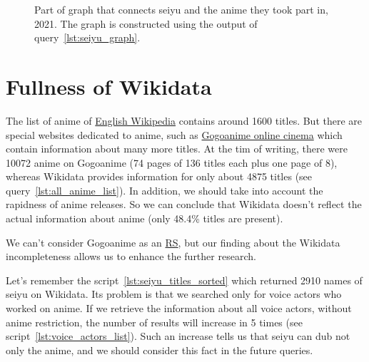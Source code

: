 \begin{figure*}

    \setlength{\fboxsep}{0pt}%
    \setlength{\fboxrule}{1pt}%
	\caption[Part of graph that connects seiyu to anime they have voiced, 2021.]{Part of graph that connects seiyu and the anime they took part in, 2021. The graph is constructed using the output of query~\ref{lst:seiyu_graph}.}%
    \label{fig:Seiyu_graph_en}%
\end{figure*} 

\section{Fullness of Wikidata}

The list of anime of \href{https://w.wiki/4Xs4}{English Wikipedia} contains around \num{1600} titles. But there are special websites dedicated to anime, such as \href{https://www1.gogoanime.cm/}{Gogoanime online cinema} which contain information about many more titles. At the tim of writing, there were \num{10072} anime on Gogoanime (\num{74} pages of \num{136} titles each plus one page of \num{8}), whereas Wikidata provides information for only about \num{4875} titles (see query~\ref{lst:all_anime_list}). In addition, we should take into account the rapidness of anime releases. So we can conclude that Wikidata doesn't reflect the actual information about anime (only \num{48.4}\% titles are present).

We can't consider Gogoanime as an \href{https://w.wiki/Eiw}{RS}, but our finding about the Wikidata incompleteness allows us to enhance the further research.

Let's remember the script~\protect\ref{lst:seiyu_titles_sorted} which returned \num{2910} names of seiyu on Wikidata. Its problem is that we searched only for voice actors who worked on anime. If we retrieve the information about all voice actors, without anime restriction, the number of results will increase in \num{5} times (see script~\protect\ref{lst:voice_actors_list}). Such an increase tells us that seiyu can dub not only the anime, and we should consider this fact in the future queries.

